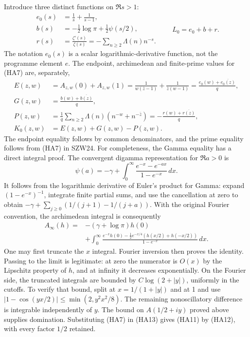 \documentclass[
  10pt,
  a4paper,
]{article}
\begin{document}
Introduce three distinct functions on \(\Re s>1\): \[
\begin{split}
e_0(s)&=\frac1s+\frac1{s-1},\\
b(s)&=-\tfrac12\log\pi+\tfrac12\psi(s/2),\\
r(s)&=\frac{\zeta'(s)}{\zeta(s)}=-\sum_{n\ge2}\Lambda(n)n^{-s}.
\end{split}\qquad L_0=e_0+b+r.
\tag{HA10}
\] The notation \(e_0(s)\) is a scalar logarithmic-derivative function,
not the programme element \(e\). The endpoint, archimedean and
finite-prime values for (HA7) are, separately, \[
\begin{split}
E(z,w)&=A_{z,w}(0)+A_{z,w}(1)
=\frac1{w(\bar z-1)}+\frac1{\bar z(w-1)}
=\frac{e_0(w)+\overline{e_0(z)}}q,\\
G(z,w)&=\frac{b(w)+\overline{b(z)}}q,\\
P(z,w)&=\frac1q\sum_{n\ge2}\Lambda(n)(n^{-w}+n^{-\bar z})
=-\frac{r(w)+\overline{r(z)}}q,\\
K_0(z,w)&=E(z,w)+G(z,w)-P(z,w).
\end{split}\tag{HA11}
\] The endpoint equality follows by common denominators, and the prime
equality follows from (HA7) in SZW24. For completeness, the Gamma
equality has a direct integral proof. The convergent digamma
representation for \(\Re a>0\) is \[
\psi(a)=-\gamma+\int_0^\infty
\frac{e^{-x}-e^{-ax}}{1-e^{-x}}\,dx.
\tag{HA12}
\] It follows from the logarithmic derivative of Euler's product for
Gamma: expand \((1-e^{-x})^{-1}\), integrate finite partial sums, and
use the cancellation at zero to obtain
\(-\gamma+\sum_{j\ge0}(1/(j+1)-1/(j+a))\). With the original Fourier
convention, the archimedean integral is consequently \[
\begin{split}
A_\infty(h)=&-(\gamma+\log\pi)h(0)\\
&+\int_0^\infty\frac{e^{-x}h(0)-\frac12e^{-x/4}(h(x/2)+h(-x/2))}{1-e^{-x}}\,dx.
\end{split}\tag{HA13}
\] One may first truncate the \(x\) integral. Fourier inversion then
proves the identity. Passing to the limit is legitimate: at zero the
numerator is \(O(x)\) by the Lipschitz property of \(h\), and at
infinity it decreases exponentially. On the Fourier side, the truncated
integrals are bounded by \(C\log(2+|y|)\), uniformly in the cutoffs. To
verify that bound, split at \(x=1/(1+|y|)\) and at 1 and use
\(|1-\cos(yx/2)|\le\min(2,y^2x^2/8)\). The remaining nonoscillatory
difference is integrable independently of \(y\). The bound on
\(A(1/2+iy)\) proved above supplies domination. Substituting (HA7) in
(HA13) gives (HA11) by (HA12), with every factor \(1/2\) retained.
\end{document}
